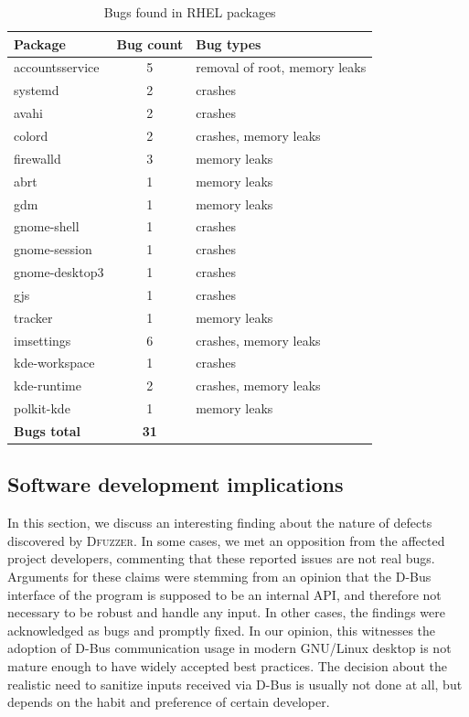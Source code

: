 \documentclass[conference]{IEEEtran}
\begin{document}
\FloatBarrier
\begin{table}[!h]
\caption{Bugs found in RHEL packages}
\label{tab:foundbugs}
\begin{center}
	\begin{tabular}{|l|c|l|}
	\hline
	\textbf{Package} & \textbf{Bug count} & \textbf{Bug types} \\ \hline \hline
	accountsservice & 5 & removal of root, memory leaks \\ \hline
	systemd & 2 & crashes \\ \hline
	avahi & 2 & crashes \\ \hline
	colord & 2 & crashes, memory leaks \\ \hline
	firewalld & 3 & memory leaks \\ \hline
	abrt & 1 & memory leaks \\ \hline
	gdm & 1 & memory leaks \\ \hline
	gnome-shell & 1 & crashes \\ \hline
	gnome-session & 1 & crashes \\ \hline
	gnome-desktop3 & 1 & crashes \\ \hline
	gjs & 1 & crashes \\ \hline
	tracker & 1 & memory leaks \\ \hline
	imsettings & 6 & crashes, memory leaks \\ \hline
	kde-workspace & 1 & crashes \\ \hline
	kde-runtime & 2 & crashes, memory leaks \\ \hline
	polkit-kde & 1 & memory leaks \\ \hline
	\textbf{Bugs total} & \textbf{31} & \\ \hline 
	\end{tabular}
\end{center}
\end{table}
\FloatBarrier

\subsection{Software development implications}
In this section, we discuss an interesting finding about the
nature of defects discovered by \textsc{Dfuzzer}. In some cases, we met an opposition
from the affected project developers, commenting that these reported issues are
not real bugs. Arguments for these claims were stemming from an
opinion that the D-Bus interface of the program is supposed to be an internal API, and
therefore not necessary to be robust and handle any input. In other cases, the
findings were acknowledged as bugs and promptly fixed. In our opinion, this
witnesses the adoption of D-Bus communication usage in modern GNU/Linux
desktop is not mature enough to have widely accepted best practices. The
decision about the realistic need to sanitize inputs received via D-Bus is usually not done at all, but depends on the habit and preference of certain developer.
\end{document}
